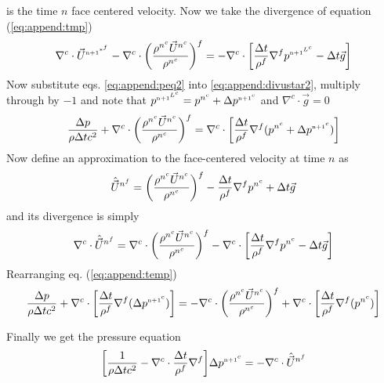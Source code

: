 \documentclass[fleqn]{article}
\begin{document}
{ is the time $n$ face centered velocity.  Now we take the divergence of
 equation (\ref{eq:append:tmp})
\begin{equation}
    \label{eq:append:divustar2}
    \nabla^{c} \cdot \ustar  - \nabla^{c} \cdot \biggl{(}\frac{\rhonc\unc}{\rhonc}\biggr{)}^f
    = 
    -\nabla^{c} \cdot \biggl{[} \frac{\delt}{\rho^{f}}
     \nabla^{f}\pnnLc - \delt \vec{g} \biggr{]}
\end{equation}
%
%
%
Now substitute eqs. \ref{eq:append:peq2} into 
\ref{eq:append:divustar2}, multiply through by $-1$ and note that $\pnnLc = \pnc + \delpc$ and $\nabla^{c} \cdot \vec{g} = 0$
%
\begin{equation}
    \label{eq:append:temp}
     \frac{ \Delta{p}}{\rho \delt c^2} + \nabla^{c} \cdot          \biggl{(}\frac{\rhonc\unc}{\rhonc}\biggr{)}^f
    = 
    \nabla^{c} \cdot \biggl{[} \frac{\delt}{\rho^{f}}
    \nabla^{f}(\pnc + \delpc)\biggr{]}
\end{equation}
%
%
Now define an approximation to the face-centered velocity at time $n$ as
%
\begin{equation}
    \label{eq:append:uhat}
        \hat{\vec{U}}^{{n}^f} 
    =   
    \biggl{(}\frac{\rhonc\unc}{\rhonc}\biggr{)}^f
    -   \frac{\delt}{\rho^{f}}\nabla^{f}\pnc + \delt\vec{g}
\end{equation}
%
%
and its divergence is simply 
%
%
\begin{equation}
    \label{eq:append:divuhat}
    \nabla^{c} \cdot \hat{\vec{U}}^{{n}^f} 
    = 
    \nabla^{c} \cdot \biggl{(}\frac{\rhonc\unc}{\rhonc}\biggr{)}^f
    - \nabla^{c} \cdot \biggl{[}\frac{\delt}{\rho^{f}}\nabla^{f}\pnc 
    - \delt \vec{g} \biggr{]}
\end{equation}
%
%
Rearranging eq. (\ref{eq:append:temp})
\begin{equation}
    \label{eq:append:temp}
    \frac{ \Delta{p}}{\rho \delt c^2} +
    \nabla^{c} \cdot \biggl{[} \frac{\delt}{\rho^{f}}
    \nabla^{f}(\delpc)\biggr{]}
    = 
    -
    \nabla^{c} \cdot          \biggl{(}\frac{\rhonc\unc}{\rhonc}\biggr{)}^f + 
    \nabla^{c} \cdot \biggl{[} \frac{\delt}{\rho^{f}}
    \nabla^{f}(\pnc)\biggr{]}
\end{equation}

Finally we get the pressure equation
\begin{equation}
        \biggl{[}\frac{ 1}{\rho \delt c^2} 
    -   \nabla^{c} \cdot \frac{\delt}{\rho^{f}}\nabla^{f} \biggr{]} \delpc       
    =   
    -   \nabla^{c} \cdot \hat{\vec{U}}^{{n}^f}
\end{equation}
%
%
%
\newpage
%
\iffalse
}
\end{document}
